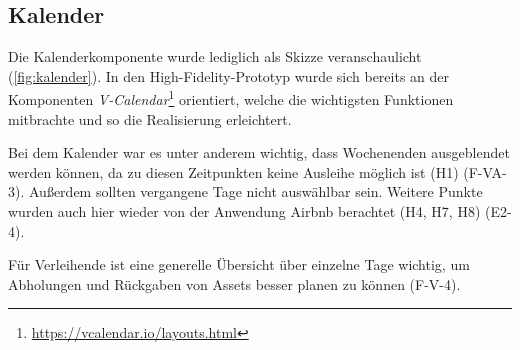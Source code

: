 \subsection{Kalender}
Die Kalenderkomponente wurde lediglich als Skizze veranschaulicht (\ref{fig:kalender}). In den High-Fidelity-Prototyp
wurde sich bereits an der Komponenten \textit{V-Calendar}\footnote{\url{https://vcalendar.io/layouts.html}}
orientiert, welche die wichtigsten Funktionen mitbrachte und so die Realisierung erleichtert.

Bei dem Kalender war es unter anderem wichtig, dass Wochenenden ausgeblendet werden können, da zu
diesen Zeitpunkten keine Ausleihe möglich ist (H1) (F-VA-3). Außerdem sollten vergangene Tage nicht
auswählbar sein. Weitere Punkte wurden auch hier wieder von der Anwendung Airbnb berachtet (H4, H7,
H8) (E2-4).

Für Verleihende ist eine generelle Übersicht über einzelne Tage wichtig, um Abholungen und
Rückgaben von Assets besser planen zu können (F-V-4).

